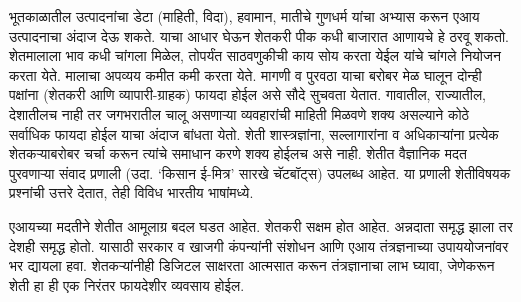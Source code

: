 भूतकाळातील उत्पादनांचा डेटा (माहिती, विदा), हवामान, मातीचे गुणधर्म यांचा अभ्यास करून एआय उत्पादनाचा अंदाज देऊ शकते. याचा आधार घेऊन शेतकरी पीक कधी बाजारात आणायचे हे ठरवू शकतो. शेतमालाला भाव कधी चांगला मिळेल, तोपर्यंत साठवणुकीची काय सोय करता येईल यांचे चांगले नियोजन करता येते. मालाचा अपव्यय कमीत कमी करता येते. मागणी व पुरवठा याचा बरोबर मेळ घालून दोन्ही पक्षांना (शेतकरी आणि व्यापारी-ग्राहक) फायदा होईल असे सौदे सुचवता येतात. गावातील, राज्यातील, देशातीलच नाही तर जगभरातील चालू असणाऱ्या व्यवहारांची माहिती मिळवणे शक्य असल्याने कोठे सर्वाधिक फायदा होईल याचा अंदाज बांधता येतो. शेती शास्त्रज्ञांना, सल्लागारांना व अधिकाऱ्यांना प्रत्येक शेतकऱ्याबरोबर चर्चा करून त्यांचे समाधान करणे शक्य होईलच असे नाही. शेतीत वैज्ञानिक मदत पुरवणाऱ्या संवाद प्रणाली (उदा. `किसान ई-मित्र' सारखे चॅटबॉट्स) उपलब्ध आहेत. या प्रणाली शेतीविषयक प्रश्नांची उत्तरे देतात, तेही विविध भारतीय भाषांमध्ये.

एआयच्या मदतीने शेतीत आमूलाग्र बदल घडत आहेत. शेतकरी सक्षम होत आहेत. अन्नदाता समृद्ध झाला तर देशही समृद्ध होतो. यासाठी सरकार व खाजगी कंपन्यांनी संशोधन आणि एआय तंत्रज्ञनाच्या उपाययोजनांवर भर द्यायला हवा. शेतकऱ्यांनीही डिजिटल साक्षरता आत्मसात करून तंत्रज्ञानाचा लाभ घ्यावा, जेणेकरून शेती हा ही एक निरंतर फायदेशीर व्यवसाय होईल.